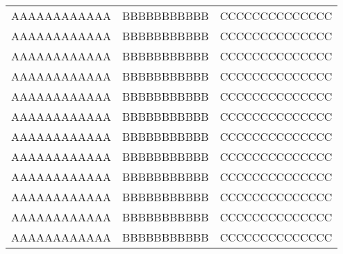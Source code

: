 \begin{longtable}{ccc}
AAAAAAAAAAAA   &   BBBBBBBBBBB   &   CCCCCCCCCCCCCC   \\
AAAAAAAAAAAA   &   BBBBBBBBBBB   &   CCCCCCCCCCCCCC   \\
AAAAAAAAAAAA   &   BBBBBBBBBBB   &   CCCCCCCCCCCCCC   \\
AAAAAAAAAAAA   &   BBBBBBBBBBB   &   CCCCCCCCCCCCCC   \\
AAAAAAAAAAAA   &   BBBBBBBBBBB   &   CCCCCCCCCCCCCC   \\
AAAAAAAAAAAA   &   BBBBBBBBBBB   &   CCCCCCCCCCCCCC   \\
AAAAAAAAAAAA   &   BBBBBBBBBBB   &   CCCCCCCCCCCCCC   \\
AAAAAAAAAAAA   &   BBBBBBBBBBB   &   CCCCCCCCCCCCCC   \\
AAAAAAAAAAAA   &   BBBBBBBBBBB   &   CCCCCCCCCCCCCC   \\
AAAAAAAAAAAA   &   BBBBBBBBBBB   &   CCCCCCCCCCCCCC   \\
AAAAAAAAAAAA   &   BBBBBBBBBBB   &   CCCCCCCCCCCCCC   \\
AAAAAAAAAAAA   &   BBBBBBBBBBB   &   CCCCCCCCCCCCCC   \\
\end{longtable}
